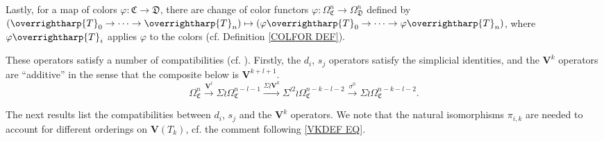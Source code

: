 \documentclass[a4paper,10pt
,draft
]{article}%
\numberwithin{equation}{section}
\numberwithin{figure}{section}
\theoremstyle{definition} %
\newcommand{\vect}[1]{\text{\overrightharp{\ensuremath{#1}}}}
\newcommand{\1}{\ensuremath{\mathbbm 1}}%
\begin{document}
Lastly, for a map of colors 
$\varphi \colon \mathfrak{C} \to \mathfrak{D}$,
there are change of color functors
$\varphi \colon \Omega^n_{\mathfrak{C}} \to \Omega^n_{\mathfrak{D}}$
defined by
$(\vect{T}_0 \to \cdots \to \vect{T}_n)
\mapsto 
(\varphi\vect{T}_0 \to \cdots \to \varphi\vect{T}_n)$,
where $\varphi \vect{T}_i$
applies $\varphi$ to the colors 
(cf. Definition \ref{COLFOR DEF}).


These operators satisfy a number of compatibilities (cf. \cite[Prop. 3.102]{BP_geo}). Firstly, the $d_i$, $s_j$ operators satisfy the  simplicial identities, 
and the $\boldsymbol{V}^k$ operators are ``additive'' in the sense that
the composite below is $\boldsymbol{V}^{k+l+1}$.
\begin{equation}\label{VKADD EQ}
\Omega^{n}_{\mathfrak{C}} \xrightarrow{\boldsymbol{V}^l} 
\Sigma \wr \Omega^{n-l-1}_{\mathfrak{C}} \xrightarrow{\Sigma \wr \boldsymbol{V}^k}
\Sigma^{\wr 2} \wr \Omega^{n-k-l-2}_{\mathfrak{C}} \xrightarrow{\sigma^0}
\Sigma \wr \Omega^{n-k-l-2}_{\mathfrak{C}}.
\end{equation}


The next results list the compatibilities between $d_i$, $s_j$ and the $\boldsymbol{V}^k$ operators.
We note that the natural isomorphisms $\pi_{i,k}$
are needed to account for different orderings on 
$\boldsymbol{V}(T_k)$,
cf. the comment following \eqref{VKDEF EQ}.
\end{document}
